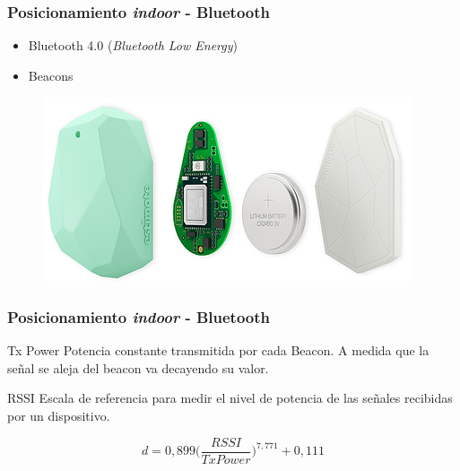 \documentclass[mathserif]{beamer}
\begin{document}

\begin{frame}
\frametitle{Posicionamiento \textit{indoor} - Bluetooth}

\begin{itemize}
\item Bluetooth 4.0 (\textit{Bluetooth Low Energy})
\item Beacons
\end{itemize}

\begin{figure}
\includegraphics[width=.5\textwidth]{../figures_chesta/estado_del_arte/beacons_estimote}
\end{figure}

\end{frame}


\begin{frame}
\frametitle{Posicionamiento \textit{indoor} - Bluetooth}

\begin{block}{Tx Power}
Potencia constante transmitida por cada Beacon. A medida que la señal se aleja del beacon va decayendo su valor.
\end{block}

\begin{block}{RSSI}
Escala de referencia para medir el nivel de potencia de las señales recibidas por un dispositivo.  
\end{block}



\begin{equation*}
d = 0,899\Bigg(\frac{RSSI}{TxPower}\Bigg)^{7,771}+0,111
\end{equation*}



\end{frame}

\end{document}
